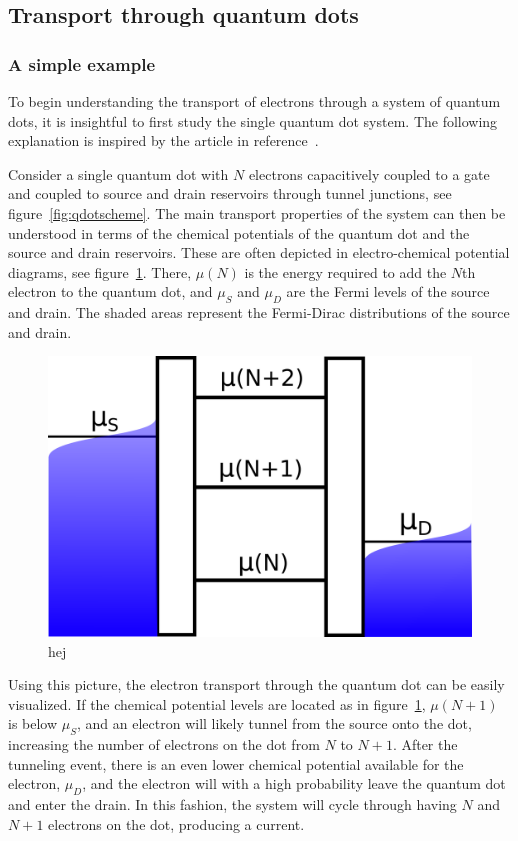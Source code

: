 \documentclass[../main.tex]{subfiles}
\begin{document}
\subsection{Transport through quantum dots}
\subsubsection{A simple example}
To begin understanding the transport of electrons through a system of quantum dots, it is insightful to first study the single quantum dot system. The following explanation is inspired by the article in reference~\cite{transport}.

Consider a single quantum dot with $N$ electrons capacitively coupled to a gate and coupled to source and drain reservoirs through tunnel junctions, see figure~\ref{fig:qdotscheme}. The main transport properties of the system can then be understood in terms of the chemical potentials of the quantum dot and the source and drain reservoirs. These are often depicted in electro-chemical potential diagrams, see figure~\ref{fig:ladder}. There, $\mu(N)$ is the energy required to add the $N$th electron to the quantum dot, and $\mu_S$ and $\mu_D$ are the Fermi levels of the source and drain. The shaded areas represent the Fermi-Dirac distributions of the source and drain.
\begin{figure}[H]
    \centering
    \includegraphics[width=0.6\linewidth]{figures/ladder.png}
    \caption{hej}
    \label{fig:ladder}
\end{figure}
Using this picture, the electron transport through the quantum dot can be easily visualized. If the chemical potential levels are located as in figure~\ref{fig:ladder}, $\mu(N + 1)$ is below $\mu_S$, and an electron will likely tunnel from the source onto the dot, increasing the number of electrons on the dot from $N$ to $N+1$. After the tunneling event, there is an even lower chemical potential available for the electron, $\mu_D$, and the electron will with a high probability leave the quantum dot and enter the drain. In this fashion, the system will cycle through having $N$ and $N+1$ electrons on the dot, producing a current.  
\end{document}
